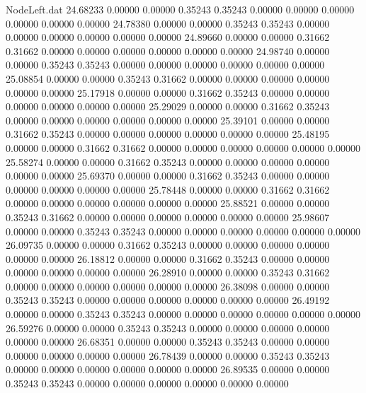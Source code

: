 \begin{filecontents}{NodeLeft.dat}
  24.68233    0.00000    0.00000     0.35243    0.35243    0.00000    0.00000    0.00000    0.00000    0.00000    0.00000
  24.78380    0.00000    0.00000     0.35243    0.35243    0.00000    0.00000    0.00000    0.00000    0.00000    0.00000
  24.89660    0.00000    0.00000     0.31662    0.31662    0.00000    0.00000    0.00000    0.00000    0.00000    0.00000
  24.98740    0.00000    0.00000     0.35243    0.35243    0.00000    0.00000    0.00000    0.00000    0.00000    0.00000
  25.08854    0.00000    0.00000     0.35243    0.31662    0.00000    0.00000    0.00000    0.00000    0.00000    0.00000
  25.17918    0.00000    0.00000     0.31662    0.35243    0.00000    0.00000    0.00000    0.00000    0.00000    0.00000
  25.29029    0.00000    0.00000     0.31662    0.35243    0.00000    0.00000    0.00000    0.00000    0.00000    0.00000
  25.39101    0.00000    0.00000     0.31662    0.35243    0.00000    0.00000    0.00000    0.00000    0.00000    0.00000
  25.48195    0.00000    0.00000     0.31662    0.31662    0.00000    0.00000    0.00000    0.00000    0.00000    0.00000
  25.58274    0.00000    0.00000     0.31662    0.35243    0.00000    0.00000    0.00000    0.00000    0.00000    0.00000
  25.69370    0.00000    0.00000     0.31662    0.35243    0.00000    0.00000    0.00000    0.00000    0.00000    0.00000
  25.78448    0.00000    0.00000     0.31662    0.31662    0.00000    0.00000    0.00000    0.00000    0.00000    0.00000
  25.88521    0.00000    0.00000     0.35243    0.31662    0.00000    0.00000    0.00000    0.00000    0.00000    0.00000
  25.98607    0.00000    0.00000     0.35243    0.35243    0.00000    0.00000    0.00000    0.00000    0.00000    0.00000
  26.09735    0.00000    0.00000     0.31662    0.35243    0.00000    0.00000    0.00000    0.00000    0.00000    0.00000
  26.18812    0.00000    0.00000     0.31662    0.35243    0.00000    0.00000    0.00000    0.00000    0.00000    0.00000
  26.28910    0.00000    0.00000     0.35243    0.31662    0.00000    0.00000    0.00000    0.00000    0.00000    0.00000
  26.38098    0.00000    0.00000     0.35243    0.35243    0.00000    0.00000    0.00000    0.00000    0.00000    0.00000
  26.49192    0.00000    0.00000     0.35243    0.35243    0.00000    0.00000    0.00000    0.00000    0.00000    0.00000
  26.59276    0.00000    0.00000     0.35243    0.35243    0.00000    0.00000    0.00000    0.00000    0.00000    0.00000
  26.68351    0.00000    0.00000     0.35243    0.35243    0.00000    0.00000    0.00000    0.00000    0.00000    0.00000
  26.78439    0.00000    0.00000     0.35243    0.35243    0.00000    0.00000    0.00000    0.00000    0.00000    0.00000
  26.89535    0.00000    0.00000     0.35243    0.35243    0.00000    0.00000    0.00000    0.00000    0.00000    0.00000
\end{filecontents}
